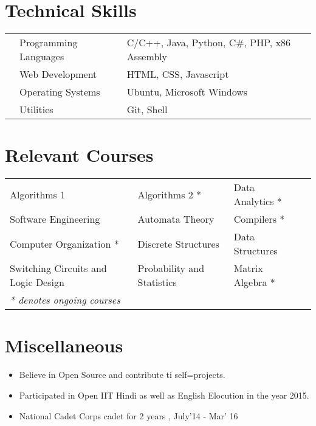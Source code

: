 \documentclass[11pt,a4paper]{moderncv}
\begin{document}
\section*{Technical Skills}
\begin{tabular}{L{0.05cm} L{5cm} l}
  &Programming Languages      &C/C++, Java, Python, C\#, PHP, x86 Assembly\\
  &Web Development              &HTML, CSS, Javascript\\
  &Operating Systems          &Ubuntu, Microsoft Windows\\
  &Utilities                  &Git, Shell\\
\end{tabular}

\section*{Relevant Courses}
\begin{tabular}{L{7.2cm} L{6.0cm} L{5.6cm}l}
  Algorithms 1 & Algorithms 2 * &
  Data Analytics * \\  Software Engineering & Automata Theory &  Compilers * \\
  Computer Organization *  & Discrete Structures & Data Structures\\
  Switching Circuits and Logic Design &
  Probability and Statistics & Matrix Algebra *\\
  \textit{* denotes ongoing courses} \\
\end{tabular}

\section*{Miscellaneous}
\begin{itemize}
  \item Believe in Open Source and contribute ti self=projects.
  \item Participated in Open IIT Hindi as well as English Elocution in the year 2015.
  \item National Cadet Corps cadet for 2 years , July'14 - Mar' 16

\end{itemize}
\end{document}
